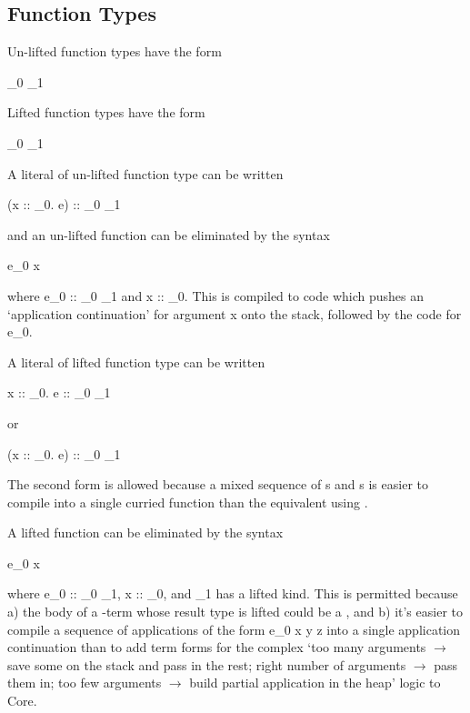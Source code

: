 \documentclass{article}
\newcommand\crkwd[1]{\hskwd{"#1}}
\newcommand\lift[1]{\left\lfloor#1\right\rfloor}
\newcommand\crlambda{\hskwd{\lambda}}
\newcommand\crllambda{\crkwd{l\lambda}}
\begin{document}
\subsection{Function Types}

Un-lifted function types have the form
\begin{haskell} \tau_0 \rightarrow \tau_1 \end{haskell}
Lifted function types have the form
\begin{haskell} \lift{\tau_0 \rightarrow \tau_1} \end{haskell}

A literal of un-lifted function type can be written
\begin{haskell} (\crlambda x :: \tau_0. e) :: \tau_0 \rightarrow \tau_1 \end{haskell}
and an un-lifted function can be eliminated by the syntax
\begin{haskell} e_0 x \end{haskell}
where \<e_0 :: \tau_0 \rightarrow \tau_1\> and \<x :: \tau_0\>.
This is compiled to code which pushes an `application continuation' for argument \<x\> onto the stack,
followed by the code for \<e_0\>.

A literal of lifted function type can be written
\begin{haskell} \lift{\crlambda x :: \tau_0. e} :: \lift{\tau_0 \rightarrow \tau_1} \end{haskell}
or
\begin{haskell} (\crllambda x :: \tau_0. e) :: \lift{\tau_0 \rightarrow \tau_1} \end{haskell}
The second form is allowed because a mixed sequence of \<\crlambda\>s and \<\crllambda\>s
is easier to compile into a single curried function than the equivalent using \<\lift{}\>.

A lifted function can be eliminated by the syntax
\begin{haskell} e_0 x \end{haskell}
where \<e_0 :: \tau_0 \rightarrow \tau_1\>, \<x :: \tau_0\>, and \<\tau_1\> has a lifted kind.
This is permitted because
a) the body of a \<\crlambda\>-term whose result type is lifted could be a \<\crllambda\>, and
b) it's easier to compile a sequence of applications of the form \<e_0 x y z\> into a single application continuation
than to add term forms for the complex
`too many arguments $\rightarrow$ save some on the stack and pass in the rest;
right number of arguments $\rightarrow$ pass them in;
too few arguments $\rightarrow$ build partial application in the heap'
logic to Core.
\end{document}
